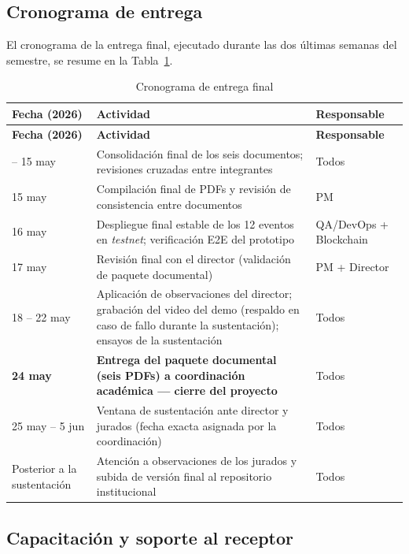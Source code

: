 \documentclass[12pt,oneside]{report}
\begin{document}
    \subsection{Cronograma de entrega}
    \label{subsec:cronograma-entrega}

      El cronograma de la entrega final, ejecutado durante las dos últimas semanas del semestre, se resume en la Tabla~\ref{tab:cronograma-entrega}.

      \begin{longtable}{@{}p{3.0cm} p{8.5cm} p{3.0cm}@{}}
        \caption{Cronograma de entrega final}
        \label{tab:cronograma-entrega}\\
        \toprule
        \textbf{Fecha (2026)} & \textbf{Actividad} & \textbf{Responsable}\\
        \midrule
        \endfirsthead
        \toprule
        \textbf{Fecha (2026)} & \textbf{Actividad} & \textbf{Responsable}\\
        \midrule
        \endhead
        \bottomrule
        \endfoot
        11 -- 15 may & Consolidación final de los seis documentos; revisiones cruzadas entre integrantes & Todos\\
        15 may & Compilación final de PDFs y revisión de consistencia entre documentos & PM\\
        16 may & Despliegue final estable de los 12 eventos en \textit{testnet}; verificación E2E del prototipo & QA/DevOps + Blockchain\\
        17 may & Revisión final con el director (validación de paquete documental) & PM + Director\\
        18 -- 22 may & Aplicación de observaciones del director; grabación del video del demo (respaldo en caso de fallo durante la sustentación); ensayos de la sustentación & Todos\\
        \textbf{24 may} & \textbf{Entrega del paquete documental (seis PDFs) a coordinación académica --- cierre del proyecto} & Todos\\
        25 may -- 5 jun & Ventana de sustentación ante director y jurados (fecha exacta asignada por la coordinación) & Todos\\
        Posterior a la sustentación & Atención a observaciones de los jurados y subida de versión final al repositorio institucional & Todos\\
      \end{longtable}

    \subsection{Capacitación y soporte al receptor}
    \label{subsec:capacitacion-soporte}
\end{document}
